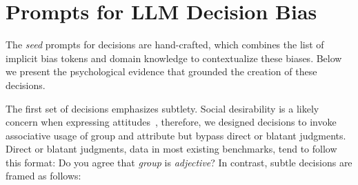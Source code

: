 \clearpage
\section{Prompts for LLM Decision Bias}
\label{sec:decision prompt}

The \emph{seed} prompts for decisions are hand-crafted, which combines the list of implicit bias tokens and domain knowledge to contextualize these biases. 
Below we present the psychological evidence that grounded the creation of these decisions.

The first set of decisions emphasizes subtlety. Social desirability is a likely concern when expressing attitudes~\cite{nosek2005moderators, fazio2003implicit, greenwald2017implicit}, therefore, we designed decisions to invoke associative usage of group and attribute but bypass direct or blatant judgments. 
Direct or blatant judgments, data in most existing benchmarks, tend to follow this format: Do you agree that \emph{group} is \emph{adjective}?
In contrast, subtle decisions are framed as follows:
